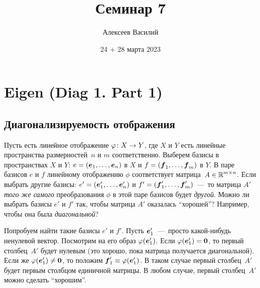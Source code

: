 \documentclass[a4paper,12pt]{article}
\author{Алексеев Василий}
\title{Семинар 7}
\date{24 + 28 марта 2023}
\begin{document}
  \maketitle
  
  \tableofcontents

  \thispagestyle{empty}
  
  \newpage
  


  \section{Eigen (Diag 1. Part 1)}
  
  \subsection{Диагонализируемость отображения}
  
  Пусть есть линейное отображение $\phi\colon X \hm\to Y$, где $X$ и $Y$ есть линейные пространства размерностей~$n$ и $m$ соответственно.
  Выберем базисы в пространствах $X$ и $Y$: $e \hm= (\bds e_1, \ldots, \bds e_n)$ в $X$ и $f \hm= (\bds f_1, \ldots, \bds f_m)$ в $Y$.
  В паре базисов $e$ и $f$ линейному отображению $\phi$ соответствует матрица~$A \hm\in \RR^{m\times n}$.
  Если выбрать другие базисы: $e' = (\boldsymbol e_1', \ldots, \boldsymbol e_n')$ и $f' = (\boldsymbol f_1', \ldots, \boldsymbol f_m')$~---~то матрица $A'$ \emph{того же самого} преобразования $\phi$ в этой паре базисов будет \emph{другой}.
  Можно ли выбрать базисы $e'$ и $f'$ так, чтобы матрица $A'$ оказалась ``хорошей''?
  Например, чтобы она была \emph{диагональной}?
  
  Попробуем найти такие базисы $e'$ и $f'$.
  Пусть $\boldsymbol e_1'$~---~просто какой-нибудь ненулевой вектор.
  Посмотрим на его образ $\varphi(\boldsymbol e_1')$.
  Если $\phi(\bds e_1') \hm= \bds 0$, то первый столбец~$A'$ будет нулевым (это хорошо, пока матрица получается диагональной).
  Если же $\phi(\bds e_1') \hm{\not=} \bds 0$, то положим $\bds f_1' \hm\equiv \phi(\bds e_1')$.
  В таком случае первый столбец~$A'$ будет первым столбцом единичной матрицы.
  В любом случае, первый столбец~$A'$ можно сделать ``хорошим''.
  
\end{document}
